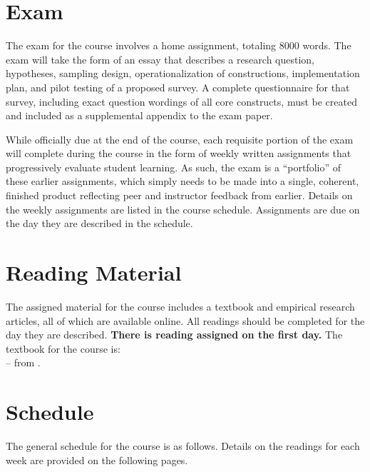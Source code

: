 \documentclass[12pt,a4paper]{article}
\newcommand{\reading}[2][]{\noindent --{#1} from \bibentry{#2}.\vspace{.25em}\\}
\begin{document}
\section{Exam}
The exam for the course involves a home assignment, totaling 8000 words. The exam will take the form of an essay that describes a research question, hypotheses, sampling design, operationalization of constructions, implementation plan, and pilot testing of a proposed survey. A complete questionnaire for that survey, including exact question wordings of all core constructs, must be created and included as a supplemental appendix to the exam paper.

While officially due at the end of the course, each requisite portion of the exam will complete during the course in the form of weekly written assignments that progressively evaluate student learning. As such, the exam is a ``portfolio'' of these earlier assignments, which simply needs to be made into a single, coherent, finished product reflecting peer and instructor feedback from earlier. Details on the weekly assignments are listed in the course schedule. Assignments are due on the day they are described in the schedule.



\section{Reading Material}
The assigned material for the course includes a textbook and empirical research articles, all of which are available online. All readings should be completed for the day they are described. \textbf{There is reading assigned on the first day.} The textbook for the course is:\\

\reading{Grovesetal2004}

\clearpage
\section{Schedule}
The general schedule for the course is as follows. Details on the readings for each week are provided on the following pages.

\secttoc

\clearpage


\end{document}
